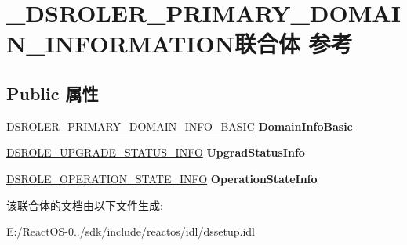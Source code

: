 \hypertarget{union___d_s_r_o_l_e_r___p_r_i_m_a_r_y___d_o_m_a_i_n___i_n_f_o_r_m_a_t_i_o_n}{}\section{\+\_\+\+D\+S\+R\+O\+L\+E\+R\+\_\+\+P\+R\+I\+M\+A\+R\+Y\+\_\+\+D\+O\+M\+A\+I\+N\+\_\+\+I\+N\+F\+O\+R\+M\+A\+T\+I\+O\+N联合体 参考}
\label{union___d_s_r_o_l_e_r___p_r_i_m_a_r_y___d_o_m_a_i_n___i_n_f_o_r_m_a_t_i_o_n}
\subsection*{Public 属性}
\begin{DoxyCompactItemize}
\item 
\mbox{\label{union___d_s_r_o_l_e_r___p_r_i_m_a_r_y___d_o_m_a_i_n___i_n_f_o_r_m_a_t_i_o_n_ad1f00cef7fd69772bc58f59aebeb2d77}} 
\hyperlink{struct___d_s_r_o_l_e_r___p_r_i_m_a_r_y___d_o_m_a_i_n___i_n_f_o___b_a_s_i_c}{D\+S\+R\+O\+L\+E\+R\+\_\+\+P\+R\+I\+M\+A\+R\+Y\+\_\+\+D\+O\+M\+A\+I\+N\+\_\+\+I\+N\+F\+O\+\_\+\+B\+A\+S\+IC} {\bfseries Domain\+Info\+Basic}
\item 
\mbox{\label{union___d_s_r_o_l_e_r___p_r_i_m_a_r_y___d_o_m_a_i_n___i_n_f_o_r_m_a_t_i_o_n_abd4f6a4bdc58fc7b78b91b1eeb953bb7}} 
\hyperlink{struct___d_s_r_o_l_e___u_p_g_r_a_d_e___s_t_a_t_u_s___i_n_f_o}{D\+S\+R\+O\+L\+E\+\_\+\+U\+P\+G\+R\+A\+D\+E\+\_\+\+S\+T\+A\+T\+U\+S\+\_\+\+I\+N\+FO} {\bfseries Upgrad\+Status\+Info}
\item 
\mbox{\label{union___d_s_r_o_l_e_r___p_r_i_m_a_r_y___d_o_m_a_i_n___i_n_f_o_r_m_a_t_i_o_n_a8428cc5d9a302a9db2ebbdc5445e55c5}} 
\hyperlink{struct___d_s_r_o_l_e___o_p_e_r_a_t_i_o_n___s_t_a_t_e___i_n_f_o}{D\+S\+R\+O\+L\+E\+\_\+\+O\+P\+E\+R\+A\+T\+I\+O\+N\+\_\+\+S\+T\+A\+T\+E\+\_\+\+I\+N\+FO} {\bfseries Operation\+State\+Info}
\end{DoxyCompactItemize}


该联合体的文档由以下文件生成\+:\begin{DoxyCompactItemize}
\item 
E\+:/\+React\+O\+S-\/0../sdk/include/reactos/idl/dssetup.\+idl\end{DoxyCompactItemize}
